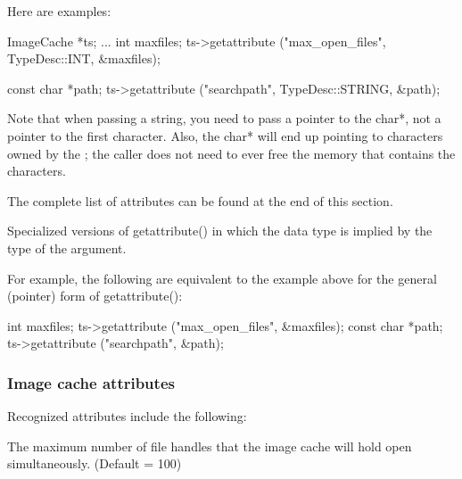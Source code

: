 Here are examples:

\begin{code}
      ImageCache *ts; 
      ...
      int maxfiles;
      ts->getattribute ("max_open_files", TypeDesc::INT, &maxfiles);

      const char *path;
      ts->getattribute ("searchpath", TypeDesc::STRING, &path);
\end{code}

Note that when passing a string, you need to pass a pointer to the {\cf
  char*}, not a pointer to the first character.  Also, the {\cf char*}
will end up pointing to characters owned by the \ImageCache; the
caller does not need to ever free the memory that contains the
characters.

The complete list of attributes can be found at the end of this section.


\apiend

Specialized versions of {\cf getattribute()} in which the data type is
implied by the type of the argument.

For example, the following are equivalent to the example above for the
general (pointer) form of {\cf getattribute()}:

\begin{code}
      int maxfiles;
      ts->getattribute ("max_open_files", &maxfiles);
      const char *path;
      ts->getattribute ("searchpath", &path);
\end{code}

\apiend


\subsubsection*{Image cache attributes}

Recognized attributes include the following:

The maximum number of file handles that the image cache will
hold open simultaneously.  (Default = 100)
\apiend

